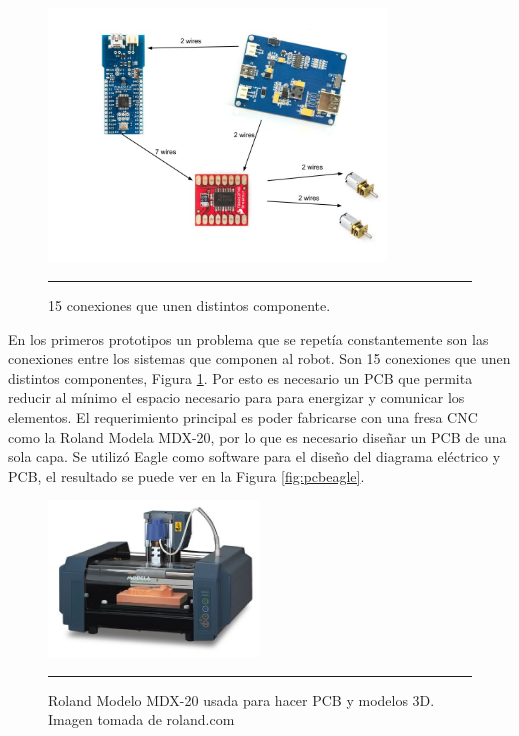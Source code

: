 \begin{figure}[htbp]
	\centering
		\includegraphics[width=0.8\textwidth]{./Figures/Diagrama.jpg}
		\rule{35em}{0.5pt}
	\caption[cables]{15 conexiones que unen distintos componente.}
	\label{fig:Diagrama cables}
\end{figure}	

En los primeros prototipos un problema que se repetía constantemente son las conexiones entre los sistemas que componen al robot. Son 15 conexiones que unen distintos componentes, Figura \ref{fig:Diagrama cables}. Por esto es necesario un PCB que permita reducir al mínimo el espacio necesario para para energizar y comunicar los elementos. El requerimiento principal es poder fabricarse con una fresa CNC como la Roland Modela MDX-20, por lo que es necesario diseñar un PCB de una sola capa. Se utilizó Eagle como software para el diseño del diagrama eléctrico y PCB, el resultado se puede ver en la Figura \ref{fig:pcbeagle}.

\begin{figure}[htbp]
	\centering
		\includegraphics[width=0.5\textwidth]{./Pictures/MDX20.jpg}
		\rule{35em}{0.5pt}
	\caption[MDX20]{Roland Modelo MDX-20 usada para hacer PCB y modelos 3D. Imagen tomada de roland.com}
	\label{fig:MDX20}
\end{figure}

